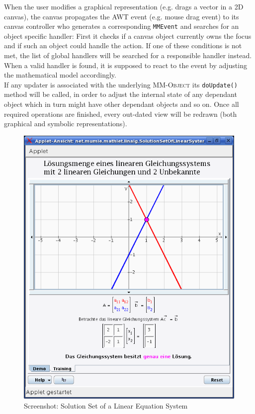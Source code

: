 \documentclass[a4paper,12pt]{article}
\newcommand{\name}[1]{\textsc{#1}}
\newcommand{\codename}[1]{\texttt{\small #1}}
\newcommand{\mmo}{\name{MM-Object }}
\begin{document}
When the user modifies a graphical representation (e.g. drags a vector in a 2D canvas), the canvas propagates
the AWT event (e.g. mouse drag event) to its canvas controller who generates a corresponding \codename{MMEvent}
and searches for an object specific handler: First it checks if a canvas object currently owns the focus and if
such an object could handle the action. If one of these conditions is not met, the list of global handlers
will be searched for a responsible handler instead. When a valid handler is found, it is supposed to react 
to the event by adjusting the mathematical model accordingly.\\
If any updater is associated with the underlying \mmo its \codename{doUpdate()} method will be called, in
order to adjust the internal state of any dependant object which in turn might have other dependant objects
and so on. Once all required operations are finished, every out-dated view will be redrawn (both 
graphical and symbolic representations).
 
\vspace{1.0cm}

\begin{figure}[h]
  \begin{center}
    \includegraphics[height=14cm]
      {images/screenshot_solution_set.png}
    \caption{Screenshot: Solution Set of a Linear Equation System}
  \end{center}
\end{figure}
\end{document}
